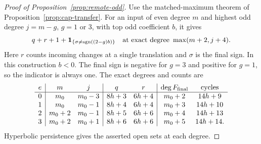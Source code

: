 \begin{proof}[Proof of Proposition~\ref{prop:remote-odd}]
Use the matched-maximum theorem of Proposition~\ref{prop:cap-transfer}. For an
input of even degree $m$ and highest odd degree $j=m-g$, $g=1$ or $3$,
with top odd coefficient $b$, it gives
\[
 q+r+1+\mathbf1_{\{\sigma\ne\operatorname{sgn}((2-g)b)\}}
 \quad\text{at exact degree }\max(m+2,j+4).
\]
Here $r$ counts incoming changes at a single translation and $\sigma$
is the final sign. In this construction $b<0$. The final sign is
negative for $g=3$ and positive for $g=1$, so the
indicator is always one. The exact degrees and counts are
\[
\begin{array}{c|cc|cc|cc}
 e & m & j & q & r & \deg F_{\rm final}&\text{cycles}\\
 \hline
 0&m_0&m_0-3&8h+3&6h+4&m_0+2&14h+9\\
 1&m_0&m_0-1&8h+4&6h+4&m_0+3&14h+10\\
 2&m_0+2&m_0-1&8h+5&6h+6&m_0+4&14h+13\\
 3&m_0+2&m_0+1&8h+6&6h+6&m_0+5&14h+14 .
\end{array}
\]
Hyperbolic persistence gives the asserted open sets at each degree.
\end{proof}
